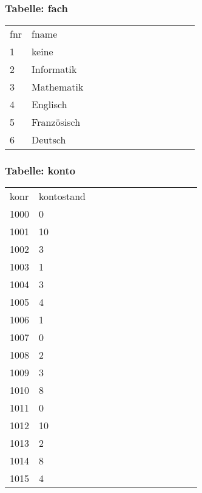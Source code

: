 \documentclass[fleqn]{scrartcl}
\begin{document}
\subsubsection{Tabelle: fach}
\begin{tabular}{|l|l|l|l|l|l|l|l|l|l|l|l|l|}\toprule
\rowcolor{green!20}
\multicolumn{2}{|c|}{
fach
}\\\midrule
\rowcolor{yellow!30}fnr & fname  \\\midrule
1& keine  \\ 
2& Informatik  \\ 
3& Mathematik  \\ 
4& Englisch  \\ 
5& Französisch  \\ 
6& Deutsch  \\ 
\bottomrule
\end{tabular}

\subsubsection{Tabelle: konto}
\begin{tabular}{|l|l|l|l|l|l|l|l|l|l|l|l|l|}\toprule
\rowcolor{green!20}
\multicolumn{2}{|c|}{
konto
}\\\midrule
\rowcolor{yellow!30}konr & kontostand  \\\midrule
1000& 0  \\ 
1001& 10  \\ 
1002& 3  \\ 
1003& 1  \\ 
1004& 3  \\ 
1005& 4  \\ 
1006& 1  \\ 
1007& 0  \\ 
1008& 2  \\ 
1009& 3  \\ 
1010& 8  \\ 
1011& 0  \\ 
1012& 10  \\ 
1013& 2  \\ 
1014& 8  \\ 
1015& 4  \\ 
\bottomrule
\end{tabular}
\end{document}
